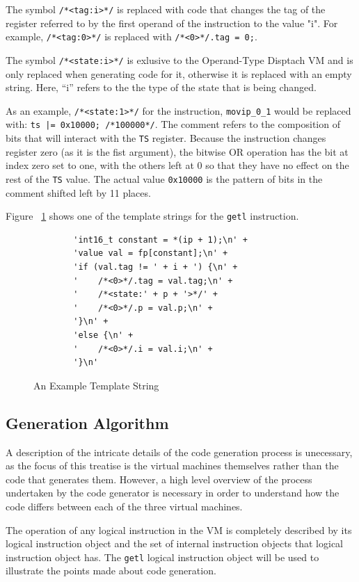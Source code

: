 \documentclass[english,a4paper,12pt]{report}
\begin{document}
The symbol \verb|/*<tag:i>*/| is replaced with code that changes the
tag of the register referred to by the first operand of the
instruction to the value "i". For example, \verb|/*<tag:0>*/| is
replaced with \verb|/*<0>*/.tag = 0;|.

The symbol \verb|/*<state:i>*/| is exlusive to the Operand-Type
Disptach VM and is only replaced when generating code for it,
otherwise it is replaced with an empty string. Here, ``i'' refers to
the the type of the state that is being changed.

As an example, \verb|/*<state:1>*/| for the instruction,
\verb|movip_0_1| would be replaced with:
\verb+ts |= 0x10000; /*100000*/+. The comment refers to the
composition of bits that will interact with the \verb|TS|
register. Because the instruction changes register zero (as it is the
fist argument), the bitwise OR operation has the bit at index zero set
to one, with the others left at 0 so that they have no effect on the
rest of the \verb|TS| value. The actual value \verb|0x10000| is the
pattern of bits in the comment shifted left by 11 places.

Figure ~\ref{fig:template-string} shows one of the template strings
for the \verb|getl| instruction.

\begin{figure}
	\begin{lstlisting}
		'int16_t constant = *(ip + 1);\n' +
		'value val = fp[constant];\n' +
		'if (val.tag != ' + i + ') {\n' +
		'    /*<0>*/.tag = val.tag;\n' +
		'    /*<state:' + p + '>*/' +
		'    /*<0>*/.p = val.p;\n' +
		'}\n' +
		'else {\n' +
		'    /*<0>*/.i = val.i;\n' +
		'}\n'
	\end{lstlisting}
	\caption{An Example Template String}
	\label{fig:template-string}
\end{figure}


\subsection{Generation Algorithm}
\label{sec:generation-algorithm}
A description of the intricate details of the code generation process
is unecessary, as the focus of this treatise is the virtual machines
themselves rather than the code that generates them. However, a high
level overview of the process undertaken by the code generator is
necessary in order to understand how the code differs between each of
the three virtual machines.

The operation of any logical instruction in the VM is completely
described by its logical instruction object and the set of internal
instruction objects that logical instruction object has. The
\verb|getl| logical instruction object will be used to illustrate the
points made about code generation.
\end{document}
